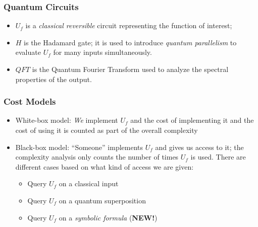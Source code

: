 \documentclass{beamer}
\begin{document}
\begin{frame}
  \frametitle{Quantum Circuits}
\begin{itemize}
\item $U_f$ is a \emph{classical reversible} circuit representing the
  function of interest; 
\item $H$ is the Hadamard gate; it is used to introduce \emph{quantum
    parallelism} to evaluate $U_f$ for many inputs simultaneously.
\item $\mathit{QFT}$ is the Quantum Fourier Transform used to analyze
  the spectral properties of the output.  
\end{itemize}
\end{frame}

\begin{frame}
  \frametitle{Cost Models}
  \begin{itemize}
\item White-box model: \emph{We} implement $U_f$ and the cost of
  implementing it and the cost of using it is counted as part of the
  overall complexity
\item Black-box model: ``Someone'' implements $U_f$ and gives us
  access to it; the complexity analysis only counts the number of
  times $U_f$ is used. There are different cases based on what kind of
  access we are given:
  \begin{itemize}
    \item Query $U_f$ on a classical input 
    \item Query $U_f$ on a quantum superposition
    \item Query $U_f$ on a \emph{symbolic formula} (\textbf{NEW!})
  \end{itemize}
    \end{itemize}
  

\end{frame}
\end{document}
